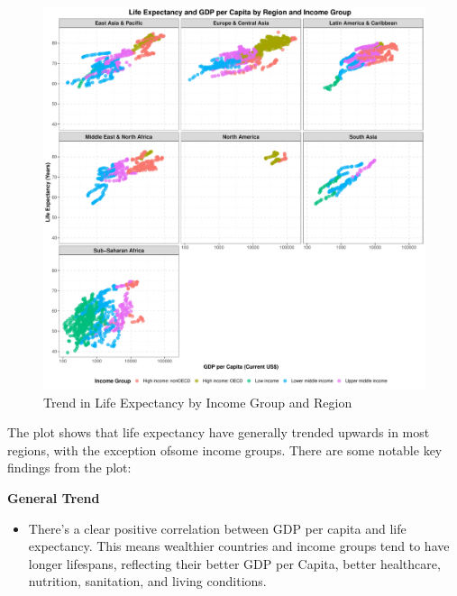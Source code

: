 \documentclass{article}\usepackage[]{graphicx}\usepackage[]{xcolor}
\makeatletter
\def\maxwidth{ %
  \ifdim\Gin@nat@width>\linewidth
    \linewidth
  \else
    \Gin@nat@width
  \fi
}
\newenvironment{knitrout}{}{} %
\makeatother
\begin{document}
\begin{figure}[h!]
\centering
\begin{knitrout}
\color{fgcolor}
\includegraphics[width=\maxwidth]{figure/unnamed-chunk-7-1} 
\end{knitrout}
\caption{Trend in Life Expectancy by Income Group and Region}
\label{fig}
\end{figure}

The plot shows that life expectancy have generally trended upwards in most regions, with the exception ofsome income groups. There are some notable key findings from the plot:

\textbf{General Trend}
\begin{itemize}

\item{There's a clear positive correlation between GDP per capita and life expectancy. This means wealthier countries and income groups tend to have longer lifespans, reflecting their better GDP per Capita, better healthcare, nutrition, sanitation, and living conditions.}
\end{itemize}
\end{document}
